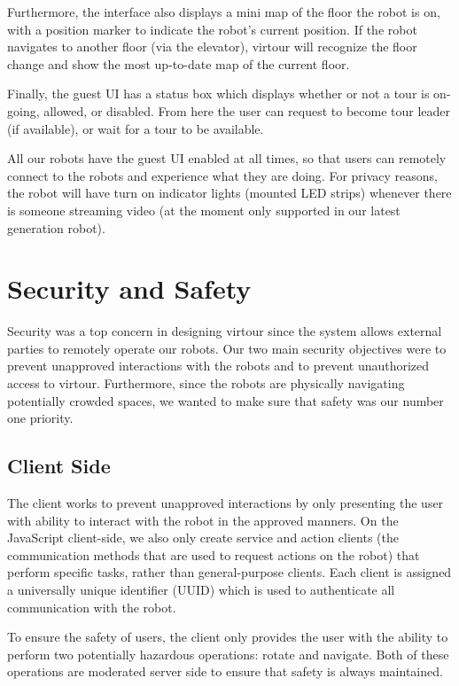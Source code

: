 \documentclass[
  oneside,
  11pt, a4paper,
  footinclude=true,
  headinclude=true,
  cleardoublepage=empty
]{article}
\begin{document}
Furthermore, the interface also displays a mini map of the floor the robot is
on, with a position marker to indicate the robot's current position.  If the
robot navigates to another floor (via the elevator), virtour will recognize the
floor change and show the most up-to-date map of the current floor.

Finally, the guest UI has a status box which displays whether or not a tour is
on-going, allowed, or disabled. From here the user can request to become tour
leader (if available), or wait for a tour to be available.

All our robots have the guest UI enabled at all times, so that users can
remotely connect to the robots and experience what they are doing. For privacy
reasons, the robot will have turn on indicator lights (mounted LED strips)
whenever there is someone streaming video (at the moment only supported in our
latest generation robot).

\section{Security and Safety}

Security was a top concern in designing virtour since the system allows
external parties to remotely operate our robots. Our two main security
objectives were to prevent unapproved interactions with the robots and to
prevent unauthorized access to virtour. Furthermore, since the robots are
physically navigating potentially crowded spaces, we wanted to make sure that
safety was our number one priority.

\subsection{Client Side}

The client works to prevent unapproved interactions by only presenting the user
with ability to interact with the robot in the approved manners. On the
JavaScript client-side, we also only create service and action clients (the
communication methods that are used to request actions on the robot) that
perform specific tasks, rather than general-purpose clients. Each client is
assigned a universally unique identifier (UUID) which is used to authenticate
all communication with the robot.

To ensure the safety of users, the client only provides the user with the
ability to perform two potentially hazardous operations: rotate and navigate.
Both of these operations are moderated server side to ensure that safety is
always maintained.
\end{document}
